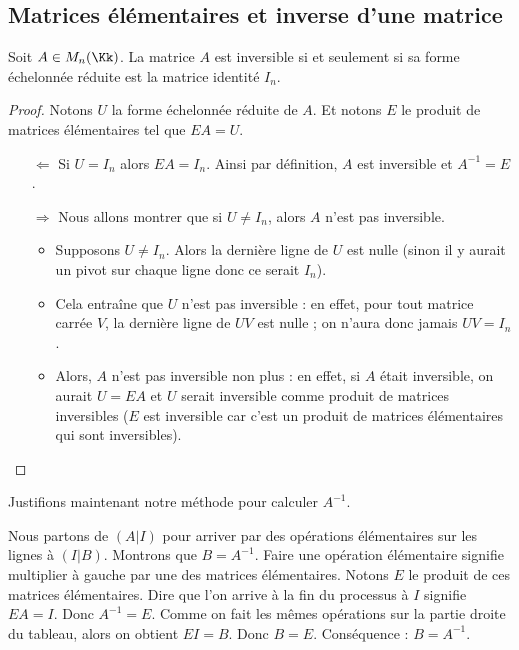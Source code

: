 \documentclass[class=report,crop=false]{standalone}
\begin{document}
\subsection{Matrices élémentaires et inverse d'une matrice}


\begin{theoreme}
\label{th:invequi}
Soit $A\in M_{n}(\Kk)$.
La matrice $A$ est inversible si et seulement si sa forme échelonnée réduite
est la matrice identité $I_n$.
\end{theoreme}

\begin{proof}
Notons $U$ la forme échelonnée réduite de $A$.
Et notons $E$ le produit de matrices élémentaires tel que $EA=U$.
\begin{itemize}
  \item[$\Longleftarrow$] Si $U=I_n$ alors $EA=I_n$. Ainsi par définition, $A$ est inversible et
  $A^{-1}= E$.

  \item[$\Longrightarrow$] Nous allons montrer que si $U\neq I_n$, alors $A$ n'est pas inversible.
  \begin{itemize}
    \item Supposons $U\neq I_n$. Alors la dernière ligne de $U$ est nulle (sinon il y aurait un pivot
    sur chaque ligne donc ce serait $I_n$).
    \item Cela entraîne que $U$ n'est pas inversible : en effet, pour tout matrice
     carrée $V$, la dernière ligne de $UV$ est nulle ; on n'aura donc jamais $UV=I_{n}$.
    \item Alors, $A$ n'est pas inversible non plus : en effet, si $A$ était inversible, on
aurait $U=EA$ et $U$ serait inversible comme produit de matrices inversibles
($E$ est inversible car c'est un produit de matrices élémentaires qui sont inversibles).
  \end{itemize}
\end{itemize}
\end{proof}

\begin{remarque*}
Justifions maintenant notre méthode pour calculer $A^{-1}$.

Nous partons de $(A|I)$ pour arriver par des opérations élémentaires sur les lignes
à $(I|B)$. Montrons que $B=A^{-1}$.
Faire une opération élémentaire signifie multiplier à gauche par une des matrices
élémentaires. Notons $E$ le produit de ces matrices élémentaires.
Dire que l'on arrive à la fin du processus à $I$ signifie $EA=I$. Donc $A^{-1}=E$.
Comme on fait les mêmes opérations sur la partie droite du tableau, alors on obtient
$EI = B$. Donc $B=E$. Conséquence : $B=A^{-1}$.
\end{remarque*}
\end{document}
